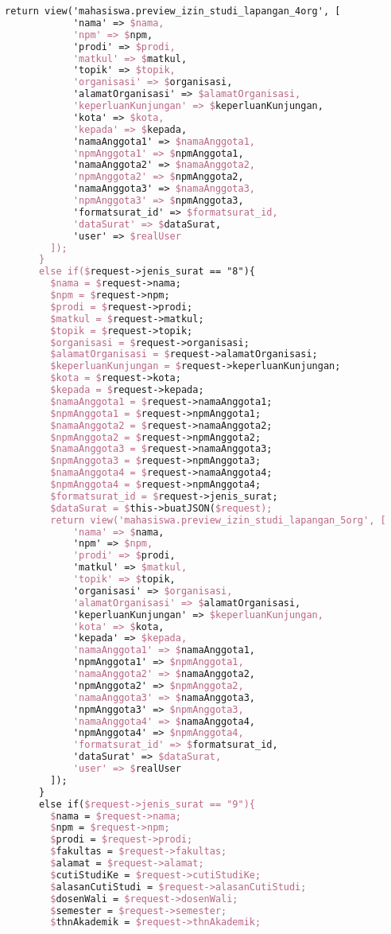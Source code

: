 \begin{lstlisting}[language=tex,basicstyle=\tiny,caption=PesanansuratController.php]
        return view('mahasiswa.preview_izin_studi_lapangan_4org', [
            'nama' => $nama,
            'npm' => $npm,
            'prodi' => $prodi,
            'matkul' => $matkul,
            'topik' => $topik,
            'organisasi' => $organisasi,
            'alamatOrganisasi' => $alamatOrganisasi,
            'keperluanKunjungan' => $keperluanKunjungan,
            'kota' => $kota,
            'kepada' => $kepada,
            'namaAnggota1' => $namaAnggota1,
            'npmAnggota1' => $npmAnggota1,
            'namaAnggota2' => $namaAnggota2,
            'npmAnggota2' => $npmAnggota2,
            'namaAnggota3' => $namaAnggota3,
            'npmAnggota3' => $npmAnggota3,
            'formatsurat_id' => $formatsurat_id,
            'dataSurat' => $dataSurat,
            'user' => $realUser
        ]);
      }
      else if($request->jenis_surat == "8"){
        $nama = $request->nama;
        $npm = $request->npm;
        $prodi = $request->prodi;
        $matkul = $request->matkul;
        $topik = $request->topik;
        $organisasi = $request->organisasi;
        $alamatOrganisasi = $request->alamatOrganisasi;
        $keperluanKunjungan = $request->keperluanKunjungan;
        $kota = $request->kota;
        $kepada = $request->kepada;
        $namaAnggota1 = $request->namaAnggota1;
        $npmAnggota1 = $request->npmAnggota1;
        $namaAnggota2 = $request->namaAnggota2;
        $npmAnggota2 = $request->npmAnggota2;
        $namaAnggota3 = $request->namaAnggota3;
        $npmAnggota3 = $request->npmAnggota3;
        $namaAnggota4 = $request->namaAnggota4;
        $npmAnggota4 = $request->npmAnggota4;
        $formatsurat_id = $request->jenis_surat;
        $dataSurat = $this->buatJSON($request);
        return view('mahasiswa.preview_izin_studi_lapangan_5org', [
            'nama' => $nama,
            'npm' => $npm,
            'prodi' => $prodi,
            'matkul' => $matkul,
            'topik' => $topik,
            'organisasi' => $organisasi,
            'alamatOrganisasi' => $alamatOrganisasi,
            'keperluanKunjungan' => $keperluanKunjungan,
            'kota' => $kota,
            'kepada' => $kepada,
            'namaAnggota1' => $namaAnggota1,
            'npmAnggota1' => $npmAnggota1,
            'namaAnggota2' => $namaAnggota2,
            'npmAnggota2' => $npmAnggota2,
            'namaAnggota3' => $namaAnggota3,
            'npmAnggota3' => $npmAnggota3,
            'namaAnggota4' => $namaAnggota4,
            'npmAnggota4' => $npmAnggota4,
            'formatsurat_id' => $formatsurat_id,
            'dataSurat' => $dataSurat,
            'user' => $realUser
        ]);
      }
      else if($request->jenis_surat == "9"){
        $nama = $request->nama;
        $npm = $request->npm;
        $prodi = $request->prodi;
        $fakultas = $request->fakultas;
        $alamat = $request->alamat;
        $cutiStudiKe = $request->cutiStudiKe;
        $alasanCutiStudi = $request->alasanCutiStudi;
        $dosenWali = $request->dosenWali;
        $semester = $request->semester;
        $thnAkademik = $request->thnAkademik;
        

\end{lstlisting}
